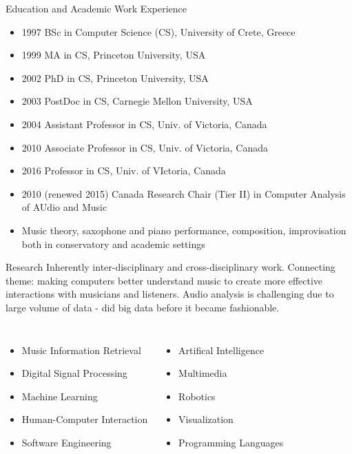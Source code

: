 \documentclass[12pt]{beamer}
\begin{document}
\begin{frame}{Education and Academic Work Experience} 

\begin{itemize} 
\item{1997 BSc in Computer Science (CS), University of Crete, Greece}
\item{1999 MA in CS, Princeton University, USA} 
\item{2002 PhD in CS, Princeton University, USA} 
\item{2003 PostDoc in CS, Carnegie Mellon University, USA}
\item{2004 Assistant Professor in CS, Univ. of Victoria, Canada} 
\item{2010 Associate Professor in CS, Univ. of Victoria, Canada}
\item{2016 Professor in CS, Univ. of VIctoria, Canada}
\item{2010 (renewed 2015) Canada Research Chair (Tier II) in Computer Analysis of AUdio and Music} 
\item{Music theory, saxophone and piano performance, composition,
  improvisation both in conservatory and academic settings}
\end{itemize}
\end{frame} 

\begin{frame}{Research}
Inherently inter-disciplinary and cross-disciplinary work. Connecting
theme: making computers better understand music to create more
effective interactions with musicians and listeners. Audio analysis is challenging due to large volume of data - did big data before it became fashionable. 

\pause  
\begin{columns}
\begin{itemize} 
\item{Music Information Retrieval} 
\item{Digital Signal Processing} 
\item{Machine Learning} 
\item{Human-Computer Interaction} 
\item{Software Engineering} 
\end{itemize} 

\begin{itemize}
\item{Artifical Intelligence}
\item{Multimedia}
\item{Robotics} 
\item{Visualization}
\item{Programming Languages} 
\end{itemize} 

\end{columns}
\end{frame}
\end{document}
